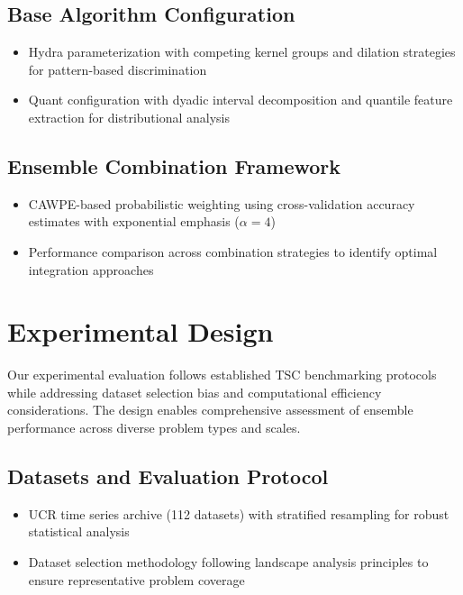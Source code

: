 \documentclass[pdflatex,sn-basic]{sn-jnl}           %
\theoremstyle{thmstyleone}%
\theoremstyle{thmstyletwo}%
\theoremstyle{thmstylethree}%
\begin{document}
\subsection{Base Algorithm Configuration}
\begin{itemize}
\item Hydra parameterization with competing kernel groups and dilation strategies for pattern-based discrimination
\item Quant configuration with dyadic interval decomposition and quantile feature extraction for distributional analysis
\end{itemize}

\subsection{Ensemble Combination Framework}
\begin{itemize}
\item CAWPE-based probabilistic weighting using cross-validation accuracy estimates with exponential emphasis ($\alpha=4$)
\item Performance comparison across combination strategies to identify optimal integration approaches
\end{itemize}

\section{Experimental Design}\label{sec4}

Our experimental evaluation follows established TSC benchmarking protocols while addressing dataset selection bias and computational efficiency considerations. The design enables comprehensive assessment of ensemble performance across diverse problem types and scales.

\subsection{Datasets and Evaluation Protocol}
\begin{itemize}
\item UCR time series archive (112 datasets) with stratified resampling for robust statistical analysis
\item Dataset selection methodology following landscape analysis principles to ensure representative problem coverage
\end{itemize}
\end{document}
